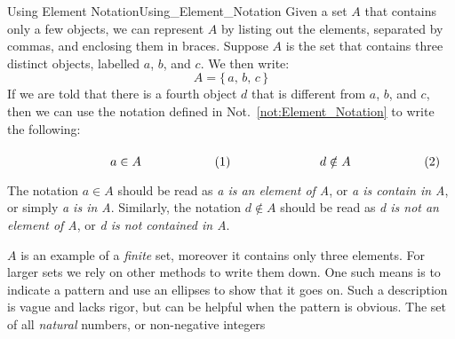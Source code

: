     \begin{fexample}{Using Element Notation}{Using_Element_Notation}
        Given a set $A$ that contains only a few objects, we can represent
        $A$ by listing out the elements, separated by commas, and enclosing
        them in braces. Suppose $A$ is the set that contains three distinct
        objects, labelled $a$, $b$, and $c$. We then write:
        \begin{equation}
            A=\{\,a,\,b,\,c\,\}
        \end{equation}
        If we are told that there is a fourth object $d$ that is different
        from $a$, $b$, and $c$, then we can use the notation defined in
        Not.~\ref{not:Element_Notation} to write the following:
        \par\hfill\par
        \begin{subequations}
            \begin{minipage}[b]{0.49\textwidth}
                \begin{equation}
                    a\in{A}
                \end{equation}
            \end{minipage}
            \hfill
            \begin{minipage}[b]{0.49\textwidth}
                \begin{equation}
                    d\notin{A}
                \end{equation}
            \end{minipage}
        \end{subequations}
        \par\vspace{2.5ex}
        The notation $a\in{A}$ should be read as \textit{a is an element of A},
        or \textit{a is contain in A}, or simply \textit{a is in A}. Similarly,
        the notation $d\notin{A}$ should be read as
        \textit{d is not an element of A}, or \textit{d is not contained in A}.
        \par\hfill\par
        $A$ is an example of a \textit{finite} set, moreover it contains only
        three elements. For larger sets we rely on other methods to write them
        down. One such means is to indicate a pattern and use an ellipses to
        show that it goes on. Such a description is vague and lacks rigor, but
        can be helpful when the pattern is obvious. The set of all
        \textit{natural} numbers, or non-negative integers

\end{fexample}
